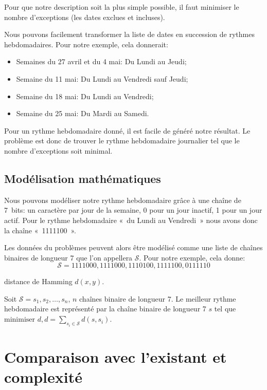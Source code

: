 \documentclass{roadef}
\begin{document}
Pour que notre description soit la plus simple possible, il faut
minimiser le nombre d'exceptions (les dates exclues et incluses).

Nous pouvons facilement transformer la liste de dates en succession de
rythmes hebdomadaires. Pour notre exemple, cela donnerait:
\begin{itemize}
\item Semaines du 27 avril et du 4 mai: Du Lundi au Jeudi;
\item Semaine du 11 mai: Du Lundi au Vendredi sauf Jeudi;
\item Semaine du 18 mai: Du Lundi au Vendredi;
\item Semaine du 25 mai: Du Mardi au Samedi.
\end{itemize}

Pour un rythme hebdomadaire donné, il est facile de généré notre
résultat.  Le problème est donc de trouver le rythme hebdomadaire
journalier tel que le nombre d'exceptions soit minimal.

\subsection{Modélisation mathématiques}

Nous pouvons modéliser notre rythme hebdomadaire grâce à une chaîne de
7~bits: un caractère par jour de la semaine, 0 pour un jour inactif, 1
pour un jour actif. Pour le rythme hebdomadaire «~du Lundi au
Vendredi~» nous avons donc la chaîne «~1111100~».

Les données du problèmes peuvent alors être modélisé comme une liste
de chaînes binaires de longueur 7 que l'on appellera
$\mathcal{S}$. Pour notre exemple, cela donne:
\begin{displaymath}
  \mathcal{S} = 1111000, 1111000, 1110100, 1111100, 0111110
\end{displaymath}

distance de Hamming \cite{hamming1950error} $d(x, y)$.

Soit $\mathcal{S} = s_1, s_2, \ldots, s_n$, $n$ chaînes binaire de
longueur 7.  Le meilleur rythme hebdomadaire est représenté par la
chaîne binaire de longueur 7 $s$ tel que
\begin{math}
  \textrm{minimiser } d, d = \sum_{s_i\in\mathcal{S}} d(s, s_i)
\end{math}.

\section{Comparaison avec l'existant et complexité}
\end{document}
